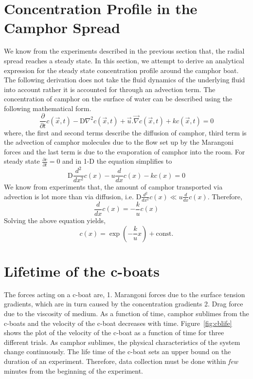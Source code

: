 \documentclass[12pt]{article}
\begin{document}
\section{Concentration Profile in the Camphor Spread}
We know from the experiments described in the previous section that, the radial spread reaches a steady state. In this section, we attempt to derive an analytical expression for the steady state concentration profile around the camphor boat. The following derivation does not take the fluid dynamics of the underlying fluid into account rather it is accounted for through an advection term. \newline
The concentration of camphor on the surface of water can be described using the following mathematical form. 
\begin{equation}
\frac{\partial}{\partial t} c(\vec{x}, t) - \mathrm{D} \nabla^2 c(\vec{x}, t) + \vec{u}.\vec{\nabla} c(\vec{x}, t) + k c(\vec{x}, t) = 0 
\end{equation}
where, the first and second terms describe the diffusion of camphor, third term is the advection of camphor molecules due to the flow set up by the Marangoni forces and the last term is due to the evaporation of camphor into the room. \newline 
For steady state $\frac{\partial c}{\partial t} = 0$ and in 1-D the equation simplifies to
\begin{equation}
\mathrm{D} \frac{d^2}{d x^2} c(x) - u \frac{d}{dx}c(x) - k c(x) = 0
\end{equation}
We know from experiments that, the amount of camphor transported via advection is lot more than via diffusion, i.e. $\mathrm{D} \frac{d^2}{d x^2} c(x) \ll u \frac{d}{dx}c(x)$. Therefore,
\begin{equation*}
\frac{d}{dx}c(x) = -\frac{k}{u}c(x)
\end{equation*}
Solving the above equation yields, 
\begin{equation}
c(x) = \exp\left(-\frac{k}{u}x\right) + \mathrm{const.}
\end{equation}
\section{Lifetime of the c-boats}
The forces acting on a c-boat are, 1. Marangoni forces due to the surface tension gradients, which are in turn caused by the concentration gradients 2. Drag force due to the viscosity of medium. As a function of time, camphor sublimes from the c-boats and the velocity of the c-boat decreases with time. Figure~\ref{fig:cblife} shows the plot of the velocity of the c-boat as a function of time for three different trials. As camphor sublimes, the physical characteristics of the system change continuously. The life time of the c-boat sets an upper bound on the duration of an experiment. Therefore, data collection must be done within \emph{few} minutes from the beginning of the experiment.   
\end{document}
